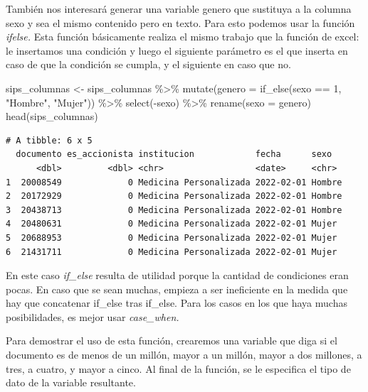 \documentclass[
  letterpaper,
  DIV=11,
  numbers=noendperiod]{scrreprt}
\newenvironment{Shaded}{\begin{snugshade}}{\end{snugshade}}
\newcommand{\AttributeTok}[1]{\textcolor[rgb]{0.40,0.45,0.13}{#1}}
\newcommand{\DecValTok}[1]{\textcolor[rgb]{0.68,0.00,0.00}{#1}}
\newcommand{\FunctionTok}[1]{\textcolor[rgb]{0.28,0.35,0.67}{#1}}
\newcommand{\NormalTok}[1]{\textcolor[rgb]{0.00,0.23,0.31}{#1}}
\newcommand{\OtherTok}[1]{\textcolor[rgb]{0.00,0.23,0.31}{#1}}
\newcommand{\SpecialCharTok}[1]{\textcolor[rgb]{0.37,0.37,0.37}{#1}}
\newcommand{\StringTok}[1]{\textcolor[rgb]{0.13,0.47,0.30}{#1}}
\begin{document}
También nos interesará generar una variable genero que sustituya a la
columna sexo y sea el mismo contenido pero en texto. Para esto podemos
usar la función \emph{ifelse.} Esta función básicamente realiza el mismo
trabajo que la función de excel: le insertamos una condición y luego el
siguiente parámetro es el que inserta en caso de que la condición se
cumpla, y el siguiente en caso que no.

\begin{Shaded}
\begin{Highlighting}[]
\NormalTok{sips\_columnas }\OtherTok{\textless{}{-}}\NormalTok{ sips\_columnas }\SpecialCharTok{\%\textgreater{}\%} 
  \FunctionTok{mutate}\NormalTok{(}\AttributeTok{genero =} \FunctionTok{if\_else}\NormalTok{(sexo }\SpecialCharTok{==} \DecValTok{1}\NormalTok{, }\StringTok{"Hombre"}\NormalTok{, }\StringTok{"Mujer"}\NormalTok{)) }\SpecialCharTok{\%\textgreater{}\%} 
  \FunctionTok{select}\NormalTok{(}\SpecialCharTok{{-}}\NormalTok{sexo) }\SpecialCharTok{\%\textgreater{}\%} 
  \FunctionTok{rename}\NormalTok{(}\AttributeTok{sexo =}\NormalTok{ genero)}
\FunctionTok{head}\NormalTok{(sips\_columnas)}
\end{Highlighting}
\end{Shaded}

\begin{verbatim}
# A tibble: 6 x 5
  documento es_accionista institucion            fecha      sexo  
      <dbl>         <dbl> <chr>                  <date>     <chr> 
1  20008549             0 Medicina Personalizada 2022-02-01 Hombre
2  20172929             0 Medicina Personalizada 2022-02-01 Hombre
3  20438713             0 Medicina Personalizada 2022-02-01 Hombre
4  20480631             0 Medicina Personalizada 2022-02-01 Mujer 
5  20688953             0 Medicina Personalizada 2022-02-01 Mujer 
6  21431711             0 Medicina Personalizada 2022-02-01 Mujer 
\end{verbatim}

En este caso \emph{if\_else} resulta de utilidad porque la cantidad de
condiciones eran pocas. En caso que se sean muchas, empieza a ser
ineficiente en la medida que hay que concatenar if\_else tras if\_else.
Para los casos en los que haya muchas posibilidades, es mejor usar
\emph{case\_when.}

Para demostrar el uso de esta función, crearemos una variable que diga
si el documento es de menos de un millón, mayor a un millón, mayor a dos
millones, a tres, a cuatro, y mayor a cinco. Al final de la función, se
le especifica el tipo de dato de la variable resultante.
\end{document}
